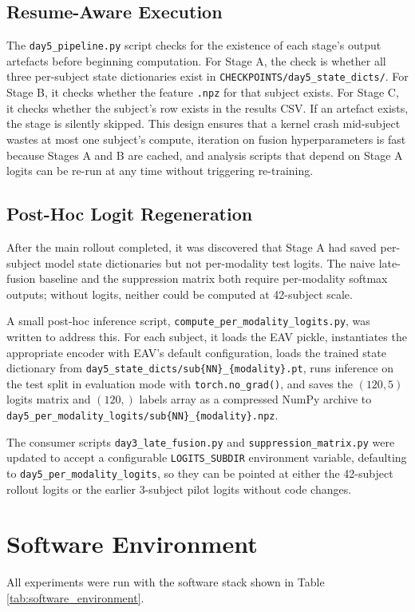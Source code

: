 \subsection{Resume-Aware Execution}
The \texttt{day5\_pipeline.py} script checks for the existence of each stage's output artefacts before beginning computation. For Stage A, the check is whether all three per-subject state dictionaries exist in \texttt{CHECKPOINTS/day5\_state\_dicts/}. For Stage B, it checks whether the feature \texttt{.npz} for that subject exists. For Stage C, it checks whether the subject's row exists in the results CSV. If an artefact exists, the stage is silently skipped. This design ensures that a kernel crash mid-subject wastes at most one subject's compute, iteration on fusion hyperparameters is fast because Stages A and B are cached, and analysis scripts that depend on Stage A logits can be re-run at any time without triggering re-training.

\subsection{Post-Hoc Logit Regeneration}
After the main rollout completed, it was discovered that Stage A had saved per-subject model state dictionaries but not per-modality test logits. The naive late-fusion baseline and the suppression matrix both require per-modality softmax outputs; without logits, neither could be computed at 42-subject scale.

A small post-hoc inference script, \texttt{compute\_per\_modality\_logits.py}, was written to address this. For each subject, it loads the EAV pickle, instantiates the appropriate encoder with EAV's default configuration, loads the trained state dictionary from \texttt{day5\_state\_dicts/sub\{NN\}\_\{modality\}.pt}, runs inference on the test split in evaluation mode with \texttt{torch.no\_grad()}, and saves the $(120,5)$ logits matrix and $(120,)$ labels array as a compressed NumPy archive to \texttt{day5\_per\_modality\_logits/sub\{NN\}\_\{modality\}.npz}.

The consumer scripts \texttt{day3\_late\_fusion.py} and \texttt{suppression\_matrix.py} were updated to accept a configurable \texttt{LOGITS\_SUBDIR} environment variable, defaulting to \texttt{day5\_per\_modality\_logits}, so they can be pointed at either the 42-subject rollout logits or the earlier 3-subject pilot logits without code changes.

\section{Software Environment}
All experiments were run with the software stack shown in Table \ref{tab:software_environment}.

